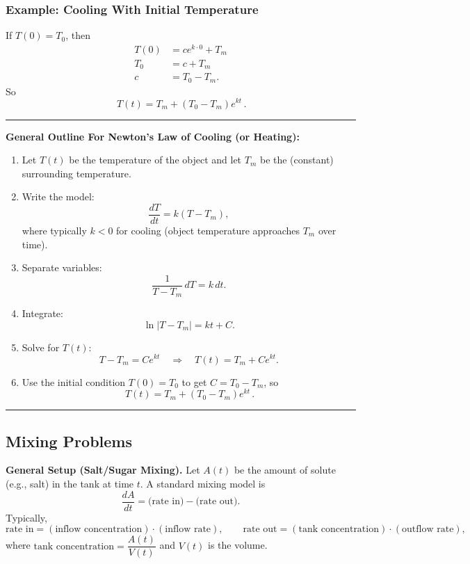 \documentclass[11pt]{article}
\begin{document}
\subsubsection*{Example: Cooling With Initial Temperature}
If $T(0)=T_0$, then
\begin{align*}
T(0) &= ce^{k\cdot 0}+T_m\\
T_0 &= c+T_m\\
c &= T_0-T_m.
\end{align*}
So
\[
\boxed{\,T(t)=T_m+(T_0-T_m)e^{kt}\,}.
\]

\noindent\rule{\linewidth}{0.4pt}
\textbf{General Outline For Newton's Law of Cooling (or Heating):}
\begin{enumerate}[topsep=2pt, itemsep=2pt, leftmargin=*]
    \item Let $T(t)$ be the temperature of the object and let $T_m$ be the (constant) surrounding temperature.
    \item Write the model:
    \[
    \frac{dT}{dt}=k\left(T-T_m\right),
    \]
    where typically $k<0$ for cooling (object temperature approaches $T_m$ over time).
    \item Separate variables:
    \[
    \frac{1}{T-T_m}\,dT = k\,dt.
    \]
    \item Integrate:
    \[
    \ln|T-T_m| = kt + C.
    \]
    \item Solve for $T(t)$:
    \[
    T-T_m = Ce^{kt}
    \quad\Rightarrow\quad
    T(t)=T_m+Ce^{kt}.
    \]
    \item Use the initial condition $T(0)=T_0$ to get $C=T_0-T_m$, so
    \[
    \boxed{\,T(t)=T_m+(T_0-T_m)e^{kt}\,}.
    \]
\end{enumerate}
\noindent\rule{\linewidth}{0.4pt}


\subsection{Mixing Problems}

\noindent \textbf{General Setup (Salt/Sugar Mixing).}
Let $A(t)$ be the amount of solute (e.g., salt) in the tank at time $t$.
A standard mixing model is
\[
\frac{dA}{dt}=\text{(rate in)}-\text{(rate out)}.
\]
Typically,
\[
\text{rate in}=(\text{inflow concentration})\cdot(\text{inflow rate}),
\qquad
\text{rate out}=(\text{tank concentration})\cdot(\text{outflow rate}),
\]
where $\text{tank concentration}=\dfrac{A(t)}{V(t)}$ and $V(t)$ is the volume.
\end{document}
